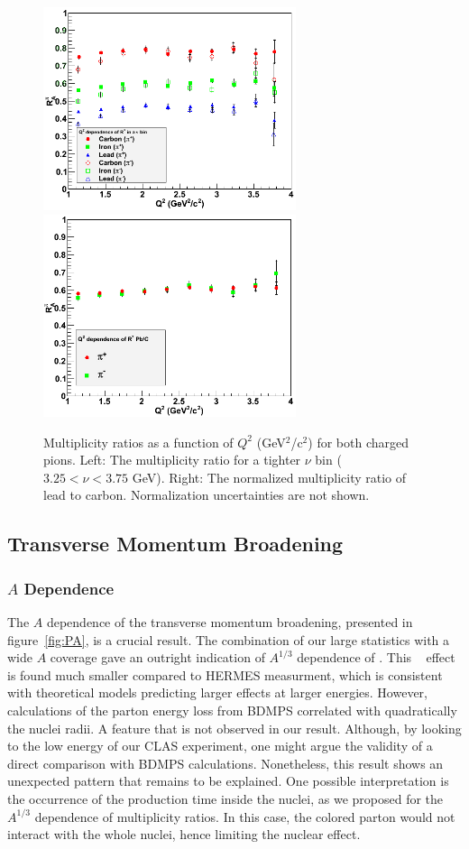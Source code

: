 \begin{figure}[tbp]
\centering
\includegraphics[width=7.4cm] {chap6-fig/F_RvQ2inNu.png} 
\includegraphics[width=7.4cm] {chap6-fig/F_RvQ2_PbC.png} 
\caption {Multiplicity ratios as a function of $Q^2$ (GeV$^2$/c$^2$) for both charged pions. Left: The multiplicity ratio for a tighter $\nu$ bin ($3.25 < \nu < 3.75$ GeV). Right: The normalized multiplicity ratio of lead to carbon. Normalization uncertainties are not shown.}
\label{fig:RQ2Detailed}
\end{figure}

\subsection{Transverse Momentum Broadening}

\subsubsection{$A$ Dependence}

The $A$ dependence of the transverse momentum broadening, presented in 
figure~\ref{fig:PA}, is a crucial result. The combination of our large 
statistics with a wide $A$ coverage gave an outright indication of $A^{1/3}$ 
dependence of \dpt. This \dptp~ effect is found much smaller compared to 
HERMES measurment\cite{Airapetian:2009jy}, which is consistent with
 theoretical models predicting larger effects at larger energies. However, 
calculations of the parton energy loss from BDMPS \cite{Baier:1996sk} 
correlated \pt with quadratically the nuclei radii. A feature that is not 
observed in our result. Although, by looking to the low energy of our CLAS 
experiment, one might argue the validity of a direct comparison with BDMPS 
calculations. Nonetheless, this result shows an unexpected pattern that 
remains to be explained. One possible interpretation is the occurrence of 
the production time inside the nuclei, as we proposed for the $A^{1/3}$ 
dependence of multiplicity ratios. In this case, the colored parton would 
not interact with the whole nuclei, hence limiting the nuclear effect.

